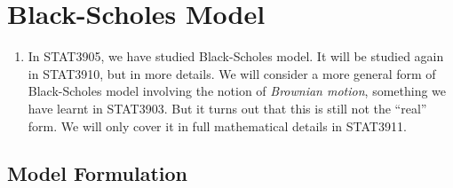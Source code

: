 \section{Black-Scholes Model}
\label{sect:bs-model}
\begin{enumerate}
\item In STAT3905, we have studied Black-Scholes model. It will be studied
again in STAT3910, but in more details. We will consider a more general form of
Black-Scholes model involving the notion of \emph{Brownian motion}, something
we have learnt in STAT3903. But it turns out that this is still not the
``real'' form.  We will only cover it in full mathematical details in STAT3911.
\end{enumerate}
\subsection{Model Formulation}
